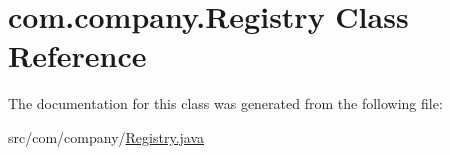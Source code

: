 \hypertarget{classcom_1_1company_1_1Registry}{}\section{com.\+company.\+Registry Class Reference}
\label{classcom_1_1company_1_1Registry}


The documentation for this class was generated from the following file\+:\begin{DoxyCompactItemize}
\item 
src/com/company/\mbox{\hyperlink{Registry_8java}{Registry.\+java}}\end{DoxyCompactItemize}
